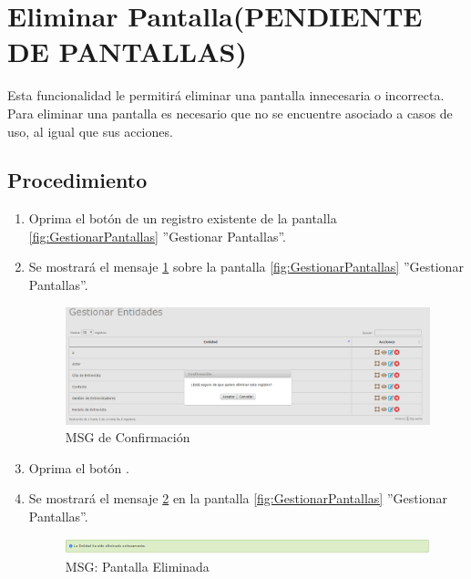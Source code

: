\hypertarget{cv:eliminarPantalla}{\section{Eliminar Pantalla(PENDIENTE DE PANTALLAS)}} \label{sec:eliminarPantalla}

	Esta funcionalidad le permitirá eliminar una pantalla innecesaria o incorrecta. Para eliminar una pantalla es necesario que no se encuentre asociado a casos de uso, al igual que sus acciones.

		\subsection{Procedimiento}

			\begin{enumerate}
	
			\item Oprima el botón \IUBotonEliminar{} de un registro existente de la pantalla \ref{fig:GestionarPantallas} ''Gestionar Pantallas''.
	
			\item Se mostrará el mensaje \ref{fig:confirmaEliminaPantalla} sobre la pantalla \ref{fig:GestionarPantallas} ''Gestionar Pantallas''.
			
			\begin{figure}[htbp!]
				\begin{center}
					\includegraphics[scale=0.5]{roles/lider/entidades/pantallas/IU12-3MSG10}
					\caption{MSG de Confirmación}
					\label{fig:confirmaEliminaPantalla}
				\end{center}
			\end{figure}
						
			\item Oprima el botón \IUAceptar.
			
			\item Se mostrará el mensaje \ref{fig:pantallaEliminada} en la pantalla \ref{fig:GestionarPantallas} ''Gestionar Pantallas''.
			
			\begin{figure}[htbp!]
				\begin{center}
					\includegraphics[scale=0.5]{roles/lider/entidades/pantallas/IU12-3MSG1}
					\caption{MSG: Pantalla Eliminada}
					\label{fig:pantallaEliminada}
				\end{center}
			\end{figure}
			\end{enumerate}